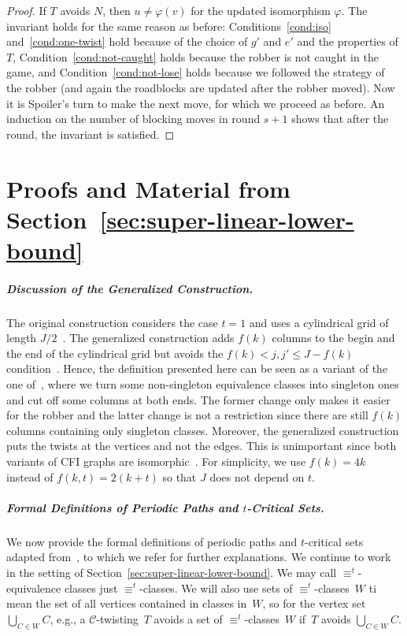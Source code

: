\documentclass[10pt,a4paper]{article}
\renewcommand{\phi}{\varphi}
\newcommand{\comp}{\equiv}
\newcommand{\grid}{\mathcal{C}}
\begin{document}
\begin{proof}
      	If $T$ avoids $N$,
      	then $u \neq \phi(v)$ for the updated isomorphism $\phi$.
        The invariant holds for the same reason as before:
        Conditions~\ref{cond:iso} and~\ref{cond:one-twist} hold because
        of the choice of $g'$ and $e'$ and the properties of $T$,
        Condition~\ref{cond:not-caught} holds because the robber is not caught in the game, and Condition~\ref{cond:not-lose} holds because
        we followed the strategy of the robber (and again the roadblocks are updated after the robber moved).
        Now it is Spoiler's turn to make the next move,
        for which we proceed as before.
        An induction on the number of blocking moves in round $s+1$
        shows that after the round, the invariant is satisfied.
\end{proof} 
\section{Proofs and Material from Section~\ref{sec:super-linear-lower-bound}}
\label{a: super-linear-lower-bound}

\subparagraph{Discussion of the Generalized Construction.}
The original construction considers the case $t=1$
and uses a cylindrical grid of length $J/2$~\cite{DBLP:conf/focs/GroheLNS23}.
The generalized construction adds $f(k)$ columns to the begin and the end of the
cylindrical grid but avoids the $f(k) < j,j' \leq J-f(k)$ condition~\cite{RFJN024}.
Hence, the definition presented here can be seen as a variant of the one of~\cite{RFJN024}, where we turn some non-singleton equivalence classes into singleton ones and cut off some columns at both ends.
The former change only makes it easier for the robber and  the latter change
is not a restriction since there are still $f(k)$ columns containing only singleton classes.
Moreover, the generalized construction puts the twists at the vertices
and not the edges. This is unimportant since both variants of CFI graphs are isomorphic~\cite{DawarGraedelLichter22}.
For simplicity, we use $f(k)=4k$ instead of $f(k,t) = 2(k+t)$ so that $J$ does not depend on $t$.


\subparagraph{Formal Definitions of Periodic Paths and $t$-Critical Sets.}
	We now provide the formal definitions of periodic paths and $t$-critical sets
	adapted from~\cite{RFJN024,DBLP:conf/focs/GroheLNS23},
	to which we refer for further explanations.
	We continue to work in the setting of Section~\ref{sec:super-linear-lower-bound}.
	We may call $\comp^t$\nobreakdash-equivalence classes just $\comp^t$-classes.
	We will also use sets of $\comp^t$-classes~$W$ ti mean the set of all vertices contained in classes in~$W$, so for the vertex set $\bigcup_{C\in W}C$,
	e.g., a $\grid$-twisting~$T$ avoids a set of $\comp^t$-classes~$W$
	if~$T$ avoids $\bigcup_{C\in W}C$.
	
\end{document}
